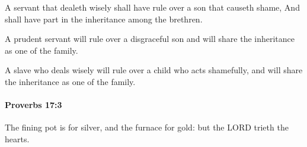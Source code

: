 			\begin{versebox}
					\item[BHS] 
					\item[ASV] A servant that dealeth wisely shall have rule over a son that causeth shame, And shall have part in the inheritance among the brethren.
					\item[NIV] A prudent servant will rule over a disgraceful son and will share the inheritance as one of the family.
					\item[NRSV] A slave who deals wisely will rule over a child who acts shamefully, and will share the inheritance as one of the family.
			\end{versebox}

		\paragraph{Proverbs 17:3} %
			\label{PROVERBS-17-3}

			The fining pot is for silver, and the furnace for gold: but the LORD trieth the hearts.

